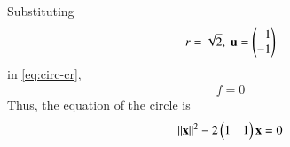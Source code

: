 Substituting
\begin{align}
	 r = \sqrt{2},\
	\mathbf{u}
	 = \begin{pmatrix}-1\\-1\end{pmatrix}
\end{align}
in 
	\eqref{eq:circ-cr},
\begin{align}
	f 
	  =0	
\end{align}
Thus, the equation of the circle is 
\begin{align}
	\left\lVert\mathbf{x}\right\rVert^2 -2\begin{pmatrix}1&1\end{pmatrix}\mathbf{x} = 0       		       
\end{align}	

